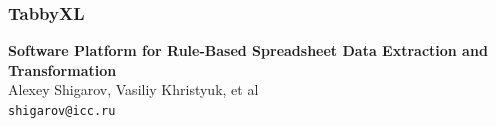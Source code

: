 \documentclass[10pt]{beamer}
\begin{document}



\begin{frame}
  \frametitle{Tabby{XL}}
  \vfill
  \begin{center}
    {\bfseries Software Platform for Rule-Based Spreadsheet Data Extraction and Transformation}\\
    \medskip
     Alexey Shigarov, Vasiliy Khristyuk, et al\\
    \medskip
    \texttt{shigarov@icc.ru} %
  \end{center}
  \vfill
\end{frame}
\end{document}
